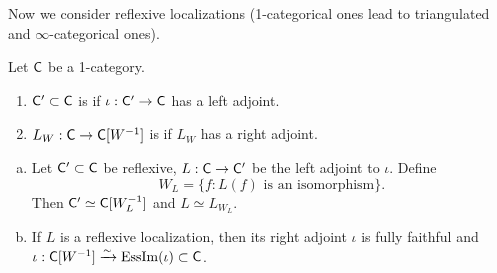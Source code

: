 Now we consider reflexive localizations (1-categorical ones lead to triangulated and $\infty$-categorical ones).
\begin{definition}
	Let $\mathsf{C}$ be a 1-category.
	\begin{enumerate}[1)]
		\item $\mathsf{C}'\subset \mathsf{C}$ is  if $\iota:\C'\to \C$ has a left adjoint.
		\item $L_W:\C\to \C[W^{-1}]$ is  if $L_W$ has a right adjoint.
	\end{enumerate}
\end{definition}

\begin{lemma} \leavevmode
	\begin{enumerate}[a)]
		\item Let $\mathsf{C}'\subset \mathsf{C}$ be reflexive, $L:\C\to \C'$ be the left adjoint to $\iota$. Define 
			\[
				W_L=\{f:L(f)\text{ is an isomorphism}\}.
			\]
			Then $\mathsf{C}'\simeq \mathsf{C}[W_L^{-1}]$ and $L\simeq L_{W_L}$.
		\item If $L$ is a reflexive localization, then its right adjoint $\iota$ is fully faithful and $\iota:\mathsf{C}[W^{-1}] \xrightarrow{\sim} \operatorname{EssIm}(\iota)\subset \mathsf{C}$.
	\end{enumerate}
\end{lemma}

